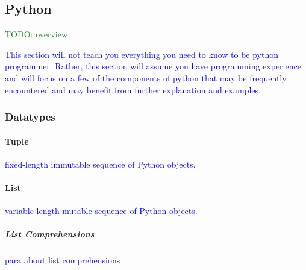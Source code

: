 \subsection{Python}

\textcolor{green}{TODO: overview}

\textcolor{blue}{This section will not teach you everything you need to know to be python programmer. Rather, this section will assume you have programming experience and will focus on a few of the components of python that may be frequently encountered and may benefit from further explanation and examples.}


\subsubsection{Datatypes}

\paragraph{Tuple}

\textcolor{blue}{fixed-length immutable sequence of Python objects.}

\paragraph{List}

\textcolor{blue}{variable-length mutable sequence of Python objects.}

\subparagraph{List Comprehensions}

\textcolor{blue}{para about list comprehensions}

